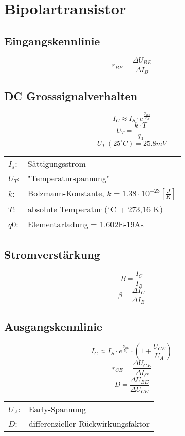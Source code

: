 



\newpage
\section{Bipolartransistor}

\subsection{Eingangskennlinie}
\[ r_{BE} = \frac{\Delta U_{BE}}{\Delta I_B} \]

\subsection{DC Grosssignalverhalten}
\[ I_C \approx I_S \cdot e^{\frac{U_{BE}}{U_T}}\]
\[ U_T= \frac{k \cdot T}{q_0} \]
\[ U_T~(25^\circ C) = 25.8 mV \]
\begin{tabular}{@{}ll}
  $I_s$:        & Sättigungsstrom \\
  $U_T$:	    & "Temperaturspannung" \\
  $k$:          & Bolzmann-Konstante, $k=1.38 \cdot 10^{-23} [\frac{J}{K}]$ \\
  $T$:          & absolute Temperatur ($^\circ$C + 273,16 K) \\
  $q0$:         & Elementarladung = 1.602E-19As \\
\end{tabular}

\subsection{Stromverstärkung}
\[ B = \frac{I_C}{I_B} \]
\[ \beta = \frac{\Delta I_C}{\Delta I_B} \]

\subsection{Ausgangskennlinie}
\[ I_C \approx I_S \cdot e^{\frac{U_{BE}}{U_T}} \cdot 
\left(1 + \frac{U_{CE}}{U_A}\right) \]
\[ r_{CE} = \frac{\Delta U_{CE}}{\Delta I_C} \]
\[ D = \frac{\Delta U_{BE}}{\Delta U_{CE}} \]
\begin{tabular}{@{}ll}
  $U_A$:	    & Early-Spannung \\
  $D$:	        & differenzieller Rückwirkungsfaktor \\
\end{tabular}

